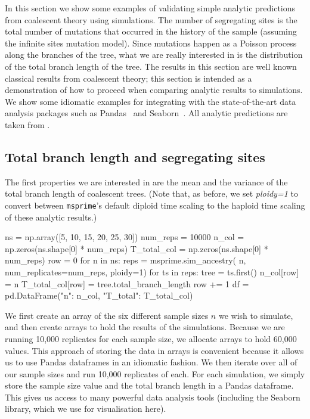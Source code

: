 \documentclass[graybox]{svmult}
\newcommand{\msprime}[0]{\texttt{msprime}}
\begin{document}
In this section we show some examples of validating simple analytic
predictions from coalescent theory using simulations. The number of
segregating sites is the total number of mutations that occurred in the
history of the sample (assuming the infinite sites mutation model).
Since mutations happen as a Poisson process along the branches of the
tree, what we are really interested in is the distribution of the total
branch length of the tree. The results in this section are well known
classical results from coalescent theory; this section is intended as a
demonstration of how to proceed when comparing analytic results to
simulations. We show some idiomatic examples for integrating with
the state-of-the-art data analysis packages such
as Pandas~\citep{mckinney2010data} and Seaborn~\citep{michael_waskom_2017_883859}.
All analytic predictions are taken from \cite{wakely2008coalescent}.

\subsection{Total branch length and segregating sites}
The first properties we are interested in are the mean and the
variance of the total branch length of coalescent trees. (Note that, as
before, we set \emph{ploidy=1} to convert between \msprime's default diploid time
scaling to the haploid time scaling of these analytic results.)

\begin{pythoncode}
ns = np.array([5, 10, 15, 20, 25, 30])
num_reps = 10000
n_col = np.zeros(ns.shape[0] * num_reps)
T_total_col = np.zeros(ns.shape[0] * num_reps)
row = 0
for n in ns:
    reps = msprime.sim_ancestry(
        n, num_replicates=num_reps, ploidy=1)
    for ts in reps:
        tree = ts.first()
        n_col[row] = n
        T_total_col[row] = tree.total_branch_length
        row += 1
df = pd.DataFrame({"n": n_col, "T_total": T_total_col})
\end{pythoncode}

    We first create an array of the six different sample sizes \(n\) we wish to simulate, and then create arrays to hold the results of the
simulations. Because we are running 10,000 replicates for each sample
size, we allocate arrays to hold 60,000 values. This approach of storing
the data in arrays is convenient because it allows us to use Pandas
dataframes in an idiomatic fashion. We then iterate
over all of our sample sizes and run 10,000 replicates of each. For each
simulation, we simply store the sample size value and the total branch
length in a Pandas dataframe. This gives us access to many powerful data analysis tools (including the Seaborn library, which we use for visualisation here).
\end{document}
